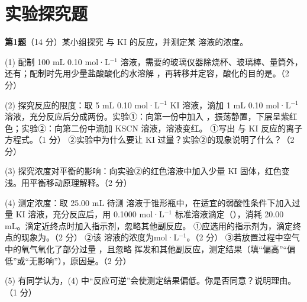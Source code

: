 \documentclass[UTF8,a4paper,zihao=5,oneside,openany,fontset=none]{ctexbook}
\newcommand{\tk}[1][3em]{\underline{\hspace{#1}}}
\begin{document}
\section{实验探究题}
\noindent\textbf{第1题}（14 分）某小组探究  与 KI 的反应，并测定某  溶液的浓度。

(1) 配制 100 mL 0.10 mol·L$^{-1}$  溶液，需要的玻璃仪器除烧杯、玻璃棒、量筒外，还有\tk；配制时先用少量盐酸酸化的水溶解 ，再转移并定容，酸化的目的是\tk。（2 分）

(2) 探究反应的限度：取 5 mL 0.10 mol·L$^{-1}$ KI 溶液，滴加 1 mL 0.10 mol·L$^{-1}$  溶液，充分反应后分成两份。实验①：向第一份中加入 ，振荡静置，下层呈紫红色；实验②：向第二份中滴加 KSCN 溶液，溶液变红。
\quad ①写出  与 KI 反应的离子方程式。（1 分）
\quad ②实验中为什么要让 KI 过量？实验②的现象说明了什么？（2 分）

(3) 探究浓度对平衡的影响：向实验②的红色溶液中加入少量 KI 固体，红色变浅。用平衡移动原理解释。（2 分）

(4) 测定浓度：取 25.00 mL 待测  溶液于锥形瓶中，在适宜的弱酸性条件下加入过量 KI 溶液，充分反应后，用 0.1000 mol·L$^{-1}$  标准溶液滴定（），消耗 20.00 mL。滴定近终点时加入指示剂，忽略其他副反应。
\quad ①应选用的指示剂为\tk，滴定终点的现象为\tk。（2 分）
\quad ②该  溶液的浓度为\tk mol·L$^{-1}$。（2 分）
\quad ③若放置过程中空气中的氧气氧化了部分过量 ，且忽略  挥发和其他副反应，测定结果\tk（填“偏高”“偏低”或“无影响”），原因是\tk。（2 分）

(5) 有同学认为，(4) 中“反应可逆”会使测定结果偏低。你是否同意？说明理由。（1 分）
\end{document}
